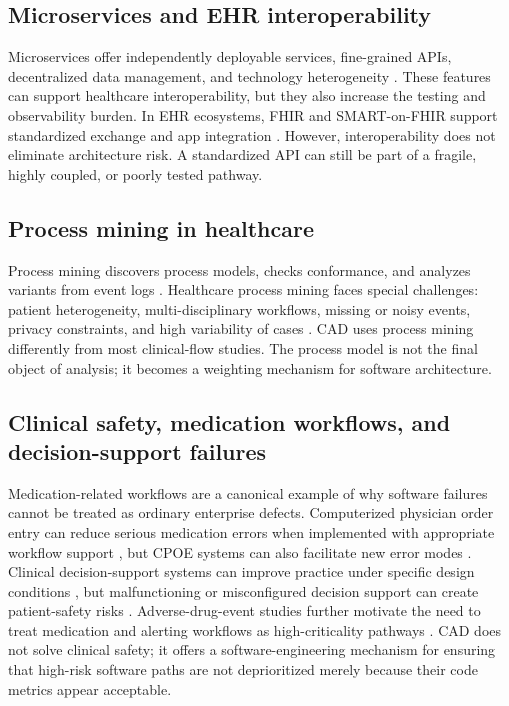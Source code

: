 \documentclass[english,preprint]{elsarticle}
\newcommand{\CAD}{\textsc{CAD}\xspace}
\begin{document}
\subsection{Microservices and EHR interoperability}

Microservices offer independently deployable services, fine-grained APIs, decentralized data management, and technology heterogeneity \cite{Newman2015Microservices,Dragoni2017Microservices,Soldani2018PainsGains,Taibi2017Microservices}. These features can support healthcare interoperability, but they also increase the testing and observability burden. In EHR ecosystems, FHIR and SMART-on-FHIR support standardized exchange and app integration \cite{FHIR2026,Mandel2016SMART}. However, interoperability does not eliminate architecture risk. A standardized API can still be part of a fragile, highly coupled, or poorly tested pathway.

\subsection{Process mining in healthcare}

Process mining discovers process models, checks conformance, and analyzes variants from event logs \cite{VanderAalst2016Book,VanderAalst2012Manifesto}. Healthcare process mining faces special challenges: patient heterogeneity, multi-disciplinary workflows, missing or noisy events, privacy constraints, and high variability of cases \cite{Rojas2016Healthcare,MunozGama2022Healthcare,DeRoock2022Perspective}. \CAD uses process mining differently from most clinical-flow studies. The process model is not the final object of analysis; it becomes a weighting mechanism for software architecture.

\subsection{Clinical safety, medication workflows, and decision-support failures}

Medication-related workflows are a canonical example of why software failures cannot be treated as ordinary enterprise defects. Computerized physician order entry can reduce serious medication errors when implemented with appropriate workflow support \cite{Bates1998CPOE}, but CPOE systems can also facilitate new error modes \cite{Koppel2005CPOE}. Clinical decision-support systems can improve practice under specific design conditions \cite{Kawamoto2005CDS}, but malfunctioning or misconfigured decision support can create patient-safety risks \cite{Wright2016Malfunctions}. Adverse-drug-event studies further motivate the need to treat medication and alerting workflows as high-criticality pathways \cite{Bates1995ADE}. \CAD does not solve clinical safety; it offers a software-engineering mechanism for ensuring that high-risk software paths are not deprioritized merely because their code metrics appear acceptable.
\end{document}
